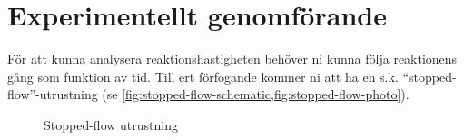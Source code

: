 \section{Experimentellt genomförande}
\label{sec:exper}
För att kunna analysera reaktionshastigheten behöver ni kunna följa
reaktionens gång som funktion av tid. Till ert förfogande kommer ni att ha en
s.k. ``stopped-flow''-utrustning (se \cref{fig:stopped-flow-schematic,fig:stopped-flow-photo}).

\begin{figure}[h,center]
  \centering
  \caption{Stopped-flow utrustning}
\end{figure}


